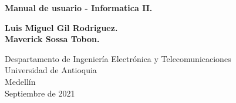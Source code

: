 \documentclass{article}
\begin{document}
\begin{titlepage}
    \begin{center}
        \vspace*{1cm}
            
        \Huge
        \textbf{Manual de usuario - Informatica II.}
            
        \vspace{0.5cm}
        \LARGE
            
        \vspace{1.5cm}
            
        \textbf{Luis Miguel Gil Rodriguez.}
        \\
        \textbf{Maverick Sossa Tobon.}
        \vfill
        \vspace{0.8cm}
            
        \Large
        Despartamento de Ingeniería Electrónica y Telecomunicaciones\\
        Universidad de Antioquia\\
        Medellín\\
        Septiembre de 2021
            
    \end{center}
\end{titlepage}
\tableofcontents
\newpage
\end{document}
